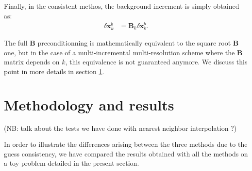 \documentclass[npg, manuscript]{copernicus}
\begin{document}
Finally, in the consistent methos, the background increment is simply obtained as:
\begin{align}
\label{eq:alternative_B}
\delta \mathbf{x}^b_k & = \mathbf{B}_k \delta \overline{\mathbf{x}}^b_k.
\end{align}

The full $\mathbf{B}$ preconditionning is mathematically equivalent to the square root $\mathbf{B}$ one, but in the case of a multi-incremental multi-resolution scheme where the $\mathbf{B}$ matrix depends on $k$, this equivalence is not guaranteed anymore. We discuss this point in more details in section \ref{sec:res}.


\section{Methodology and results}
\label{sec:res}

(NB: talk about the tests we have done with nearest neighbor interpolation ?)

In order to illustrate the differences arising between the three methods due to the guess consistency, we have compared the results obtained with all the methods on a toy problem detailed in the present section.
\end{document}
